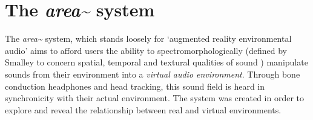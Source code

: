 %
%
%


\section{The \textit{area\textasciitilde{}} system}      \label{sec: area-system}
The \textit{\textit{area\textasciitilde{}}}  system, which stands loosely for ‘augmented reality environmental audio’ aims to afford users the ability to spectromorphologically (defined by Smalley to concern spatial, temporal and textural qualities of sound \citeyearpar{smalley1997}) manipulate sounds from their environment into a \textit{virtual audio environment}. Through bone conduction headphones and head tracking, this sound field is heard in synchronicity with their actual environment. The system was created in order to explore and reveal the relationship between real and virtual environments.

